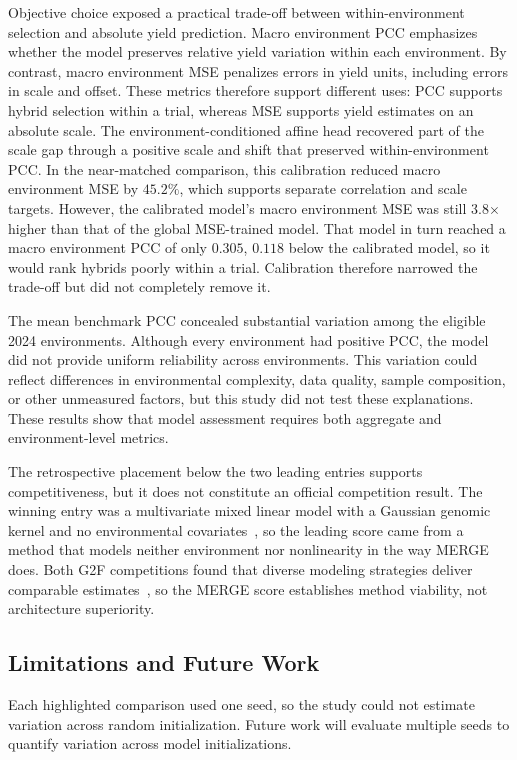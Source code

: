 Objective choice exposed a practical trade-off between within-environment selection and absolute yield prediction. Macro environment PCC emphasizes whether the model preserves relative yield variation within each environment. By contrast, macro environment MSE penalizes errors in yield units, including errors in scale and offset. These metrics therefore support different uses: PCC supports hybrid selection within a trial, whereas MSE supports yield estimates on an absolute scale. The environment-conditioned affine head recovered part of the scale gap through a positive scale and shift that preserved within-environment PCC. In the near-matched comparison, this calibration reduced macro environment MSE by $45.2\%$, which supports separate correlation and scale targets. However, the calibrated model's macro environment MSE was still 3.8$\times$ higher than that of the global MSE-trained model. That model in turn reached a macro environment PCC of only $0.305$, $0.118$ below the calibrated model, so it would rank hybrids poorly within a trial. Calibration therefore narrowed the trade-off but did not completely remove it.

The mean benchmark PCC concealed substantial variation among the eligible 2024 environments. Although every environment had positive PCC, the model did not provide uniform reliability across environments. This variation could reflect differences in environmental complexity, data quality, sample composition, or other unmeasured factors, but this study did not test these explanations. These results show that model assessment requires both aggregate and environment-level metrics.

The retrospective placement below the two leading entries supports competitiveness, but it does not constitute an official competition result. The winning entry was a multivariate mixed linear model with a Gaussian genomic kernel and no environmental covariates~\cite{batista2026competition}, so the leading score came from a method that models neither environment nor nonlinearity in the way MERGE does. Both G2F competitions found that diverse modeling strategies deliver comparable estimates~\cite{g2f-maize-2025, batista2026competition}, so the MERGE score establishes method viability, not architecture superiority.

\subsection{Limitations and Future Work}
Each highlighted comparison used one seed, so the study could not estimate variation across random initialization. Future work will evaluate multiple seeds to quantify variation across model initializations.


